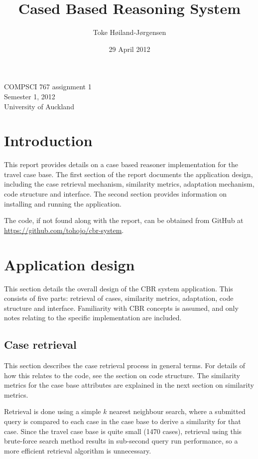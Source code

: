 \documentclass[a4paper,11pt]{scrartcl}
\title{Cased Based Reasoning System}
\author{Toke Høiland-Jørgensen}
\date{29 April 2012}
\begin{document}
\maketitle

\begin{center}
\sffamily
{\large COMPSCI 767 assignment 1}\\
Semester 1, 2012\\
University of Auckland
\end{center}

\setcounter{tocdepth}{3}
\tableofcontents
\vspace*{1cm}

\section{Introduction}
This report provides details on a case based reasoner implementation
for the travel case base. The first section of the report documents
the application design, including the case retrieval mechanism,
similarity metrics, adaptation mechanism, code structure and
interface. The second section provides information on installing and
running the application.

The code, if not found along with the report, can be obtained from
GitHub at \url{https://github.com/tohojo/cbr-system}.
\clearpage

\section{Application design}
This section details the overall design of the CBR system application.
This consists of five parts: retrieval of cases, similarity metrics,
adaptation, code structure and interface. Familiarity with CBR
concepts is assumed, and only notes relating to the specific
implementation are included.

\subsection{Case retrieval}
This section describes the case retrieval process in general terms.
For details of how this relates to the code, see the section on code
structure. The similarity metrics for the case base attributes are
explained in the next section on similarity metrics.

Retrieval is done using a simple $k$ nearest neighbour search, where a
submitted query is compared to each case in the case base to derive a
similarity for that case. Since the travel case base is quite small
(1470 cases), retrieval using this brute-force search method results
in sub-second query run performance, so a more efficient retrieval
algorithm is unnecessary.
\end{document}
